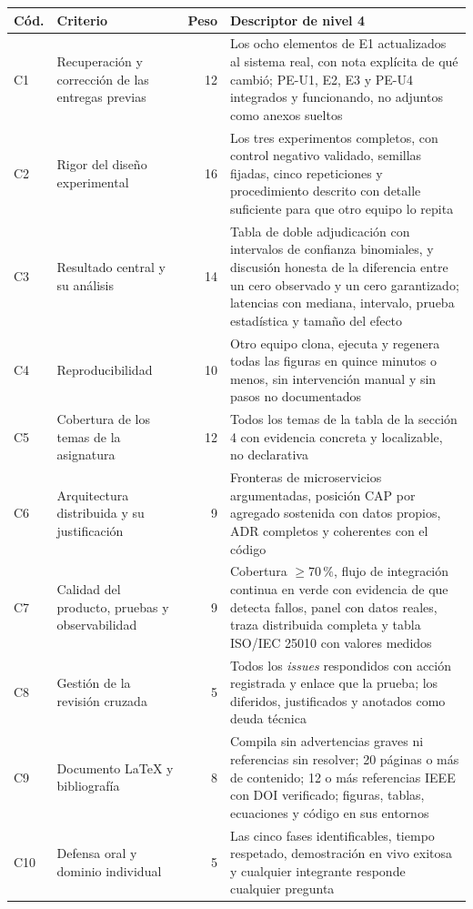 \documentclass[11pt,a4paper]{article}
\begin{document}
	\begin{center}
		\footnotesize
		\begin{longtable}{@{}p{0.8cm}p{5.2cm}rp{7.4cm}@{}}
			\toprule
			\textbf{Cód.} & \textbf{Criterio} & \textbf{Peso} & \textbf{Descriptor de nivel 4} \\
			\midrule
			\endhead
			C1 & Recuperación y corrección de las entregas previas & 12 & Los ocho elementos de E1 actualizados al sistema real, con nota explícita de qué cambió; PE-U1, E2, E3 y PE-U4 integrados y funcionando, no adjuntos como anexos sueltos \\
			\addlinespace
			C2 & Rigor del diseño experimental & 16 & Los tres experimentos completos, con control negativo validado, semillas fijadas, cinco repeticiones y procedimiento descrito con detalle suficiente para que otro equipo lo repita \\
			\addlinespace
			C3 & Resultado central y su análisis & 14 & Tabla de doble adjudicación con intervalos de confianza binomiales, y discusión honesta de la diferencia entre un cero observado y un cero garantizado; latencias con mediana, intervalo, prueba estadística y tamaño del efecto \\
			\addlinespace
			C4 & Reproducibilidad & 10 & Otro equipo clona, ejecuta y regenera todas las figuras en quince minutos o menos, sin intervención manual y sin pasos no documentados \\
			\addlinespace
			C5 & Cobertura de los temas de la asignatura & 12 & Todos los temas de la tabla de la sección 4 con evidencia concreta y localizable, no declarativa \\
			\addlinespace
			C6 & Arquitectura distribuida y su justificación & 9 & Fronteras de microservicios argumentadas, posición CAP por agregado sostenida con datos propios, ADR completos y coherentes con el código \\
			\addlinespace
			C7 & Calidad del producto, pruebas y observabilidad & 9 & Cobertura $\geq 70\,\%$, flujo de integración continua en verde con evidencia de que detecta fallos, panel con datos reales, traza distribuida completa y tabla ISO/IEC 25010 con valores medidos \\
			\addlinespace
			C8 & Gestión de la revisión cruzada & 5 & Todos los \emph{issues} respondidos con acción registrada y enlace que la prueba; los diferidos, justificados y anotados como deuda técnica \\
			\addlinespace
			C9 & Documento LaTeX y bibliografía & 8 & Compila sin advertencias graves ni referencias sin resolver; 20 páginas o más de contenido; 12 o más referencias IEEE con DOI verificado; figuras, tablas, ecuaciones y código en sus entornos \\
			\addlinespace
			C10 & Defensa oral y dominio individual & 5 & Las cinco fases identificables, tiempo respetado, demostración en vivo exitosa y cualquier integrante responde cualquier pregunta \\
			\bottomrule
		\end{longtable}
	\end{center}
	
\end{document}
